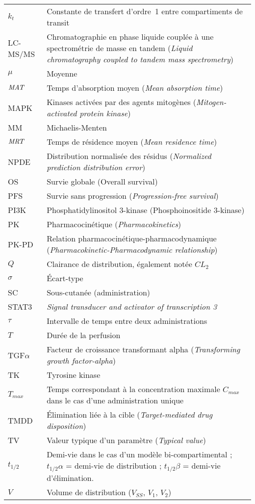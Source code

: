 \begin{tabularx}{30em}{X X}
$k_t$ & 	Constante de transfert d'ordre~1 entre compartiments de transit\\
LC-MS/MS & 	Chromatographie en phase liquide couplée à une spectrométrie de masse en tandem (\textit{Liquid chromatography coupled to tandem mass spectrometry})\\
$\mu$ & 	Moyenne\\
$\operatorname{\textit{MAT}}$ & 	Temps d'absorption moyen (\textit{Mean absorption time})\\
MAPK & 	Kinases activées par des agents mitogènes (\textit{Mitogen-activated protein kinase})\\
MM & 	Michaelis-Menten\\
$\operatorname{\textit{MRT}}$ & 	Temps de résidence moyen (\textit{Mean residence time})\\
NPDE & 	Distribution normalisée des résidus (\textit{Normalized prediction distribution error})\\
OS & 	Survie globale (Overall survival)\\
PFS & 	Survie sans progression (\textit{Progression-free survival})\\
PI3K & 	Phosphatidylinositol 3-kinase (Phosphoinositide 3-kinase)\\
PK & 	Pharmacocinétique (\textit{Pharmacokinetics})\\
PK-PD & 	Relation pharmacocinétique-pharmacodynamique (\textit{Pharmacokinetic-Pharmacodynamic relationship})\\
$Q$ & 	Clairance de distribution, également notée $CL_2$\\
$\sigma$ & 	Écart-type\\
SC & 	Sous-cutanée (administration)\\
STAT3 & 	\textit{Signal transducer and activator of transcription 3}\\
$\tau$ & 	Intervalle de temps entre deux administrations\\
$T$ & 	Durée de la perfusion\\
TGF$\alpha$ & 	Facteur de croissance transformant alpha (\textit{Transforming growth factor-alpha})\\
TK & 	Tyrosine kinase \\
$T_{max}$ & 	Temps correspondant à la concentration maximale $C_{max}$ dans le cas d'une administration unique\\
TMDD & 	Élimination liée à la cible (\textit{Target-mediated drug disposition})\\
TV & 	Valeur typique d'un paramètre (\textit{Typical value})\\
$t_{1/2}$ & 	Demi-vie dans le cas d'un modèle bi-compartimental ; $t_{1/2}\alpha$ = demi-vie de distribution ; $t_{1/2}\beta$ = demi-vie d'élimination.\\
$V$ & 	Volume de distribution ($V_{SS}$, $V_1$, $V_2$)\\
\end{tabularx}

